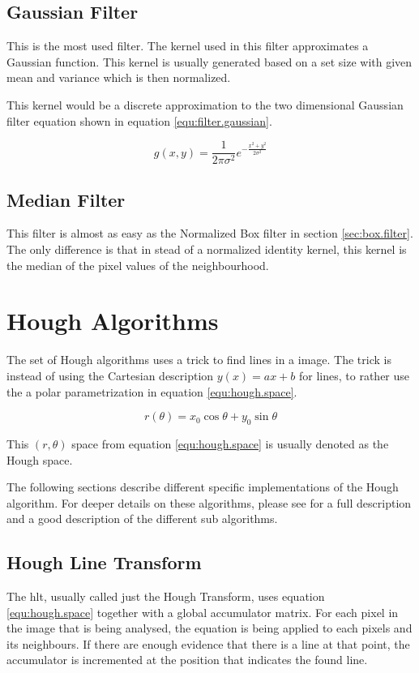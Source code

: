 \subsection{Gaussian Filter}\label{sec:gaussian.filter}
This is the most used filter. The kernel used in this filter approximates a Gaussian function. This kernel 
is usually generated based on a set size with given mean and variance which is then normalized.

This kernel would be a discrete approximation to the two dimensional Gaussian filter equation shown in equation \eqref{equ:filter.gaussian}.

\begin{equation}\label{equ:filter.gaussian}
	g(x,y) = \frac{1}{2 \pi \sigma^2}e^{-\frac{x^2 + y^2}{2 \sigma^2}}
\end{equation}

\subsection{Median Filter}\label{sec:median.filter}
This filter is almost as easy as the Normalized Box filter in section \vref{sec:box.filter}. The only difference is that 
in stead of a normalized identity kernel, this kernel is the median of the pixel values of the neighbourhood.

\section{Hough Algorithms}
The set of Hough algorithms uses a trick to find lines in a image. The trick is 
instead of using the Cartesian description $y(x)=ax+b$ for lines, to rather use the 
a polar parametrization in equation \eqref{equ:hough.space}.

\begin{equation}\label{equ:hough.space}
	r(\theta) = x_0\cos \theta + y_0\sin \theta
\end{equation}

This $(r,\theta)$ space from equation \eqref{equ:hough.space}
is usually denoted as the Hough space.

The following sections describe different specific implementations of the Hough algorithm. For 
deeper details on these algorithms, please see \citet{sonka07} for a full description and 
a good description of the different sub algorithms.

\subsection{Hough Line Transform}\label{sec:hough.transform}
The \gls{hlt}, usually called just the Hough Transform, uses equation \eqref{equ:hough.space} together 
with a global accumulator matrix. For each pixel in the image that is being analysed, the equation is being applied 
to each pixels and its neighbours. If there are enough evidence that there is a line at that point, the accumulator 
is incremented at the position that indicates the found line.

